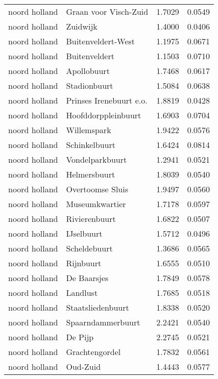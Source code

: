 \begin{longtable}{llcc}
noord holland & Graan voor Visch-Zuid & 1.7029 & 0.0549 \\
noord holland & Zuidwijk & 1.4000 & 0.0406 \\
noord holland & Buitenveldert-West & 1.1975 & 0.0671 \\
noord holland & Buitenveldert & 1.1503 & 0.0710 \\
noord holland & Apollobuurt & 1.7468 & 0.0617 \\
noord holland & Stadionbuurt & 1.5084 & 0.0638 \\
noord holland & Prinses Irenebuurt e.o. & 1.8819 & 0.0428 \\
noord holland & Hoofddorppleinbuurt & 1.6903 & 0.0704 \\
noord holland & Willemspark & 1.9422 & 0.0576 \\
noord holland & Schinkelbuurt & 1.6424 & 0.0814 \\
noord holland & Vondelparkbuurt & 1.2941 & 0.0521 \\
noord holland & Helmersbuurt & 1.8039 & 0.0540 \\
noord holland & Overtoomse Sluis & 1.9497 & 0.0560 \\
noord holland & Museumkwartier & 1.7178 & 0.0597 \\
noord holland & Rivierenbuurt & 1.6822 & 0.0507 \\
noord holland & IJselbuurt & 1.5712 & 0.0496 \\
noord holland & Scheldebuurt & 1.3686 & 0.0565 \\
noord holland & Rijnbuurt & 1.6555 & 0.0510 \\
noord holland & De Baarsjes & 1.7849 & 0.0578 \\
noord holland & Landlust & 1.7685 & 0.0518 \\
noord holland & Staatsliedenbuurt & 1.8338 & 0.0520 \\
noord holland & Spaarndammerbuurt & 2.2421 & 0.0540 \\
noord holland & De Pijp & 2.2745 & 0.0521 \\
noord holland & Grachtengordel & 1.7832 & 0.0561 \\
noord holland & Oud-Zuid & 1.4443 & 0.0577 \\
\hline
\end{longtable}
